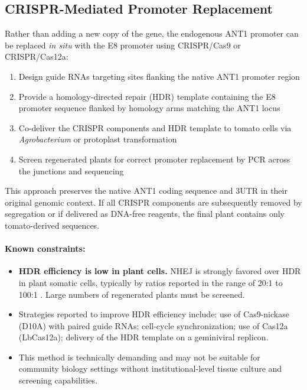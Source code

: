 \documentclass[12pt,a4paper]{article}
\begin{document}
\subsection{CRISPR-Mediated Promoter Replacement}

Rather than adding a new copy of the gene, the endogenous ANT1 promoter can be replaced \textit{in situ} with the E8 promoter using CRISPR/Cas9 or CRISPR/Cas12a:

\begin{enumerate}
  \item Design guide RNAs targeting sites flanking the native ANT1 promoter region
  \item Provide a homology-directed repair (HDR) template containing the E8 promoter sequence flanked by homology arms matching the ANT1 locus
  \item Co-deliver the CRISPR components and HDR template to tomato cells via \textit{Agrobacterium} or protoplast transformation
  \item Screen regenerated plants for correct promoter replacement by PCR across the junctions and sequencing
\end{enumerate}

This approach preserves the native ANT1 coding sequence and 3\textquotesingle{}UTR in their original genomic context. If all CRISPR components are subsequently removed by segregation or if delivered as DNA-free reagents, the final plant contains only tomato-derived sequences.

\paragraph{Known constraints:}
\begin{itemize}
  \item \textbf{HDR efficiency is low in plant cells.} NHEJ is strongly favored over HDR in plant somatic cells, typically by ratios reported in the range of 20:1 to 100:1 \citep{Puchta2005, Steinert2016}. Large numbers of regenerated plants must be screened.
  \item Strategies reported to improve HDR efficiency include: use of Cas9-nickase (D10A) with paired guide RNAs; cell-cycle synchronization; use of Cas12a (LbCas12a); delivery of the HDR template on a geminiviral replicon.
  \item This method is technically demanding and may not be suitable for community biology settings without institutional-level tissue culture and screening capabilities.
\end{itemize}
\end{document}
